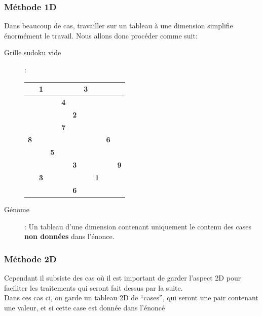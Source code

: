             \subsubsection{Méthode 1D}
                Dans beaucoup de cas, travailler sur un tableau à une dimension simplifie énormément le travail. Nous allons donc procéder comme suit:
                \begin{description}
                    \item[Grille sudoku vide]:\\
                        \begin{center}
                            \begin{tabular}{|c|c|c| |c|c|c| |c|c|c|}
                                \hline
                                &\textbf{1}&&&&\textbf{3}&&&\\
                                \hline
                                &&&\textbf{4}&&&&&\\
                                \hline
                                &&&&\textbf{2}&&&&\\
                                \hline
                                \hline
                                &&&\textbf{7}&&&&&\\
                                \hline
                                \textbf{8}&&&&&&&\textbf{6}&\\
                                \hline
                                &&\textbf{5}&&&&&&\\
                                \hline
                                \hline
                                &&&&\textbf{3}&&&&\textbf{9}\\
                                \hline
                                &\textbf{3}&&&&&\textbf{1}&&\\
                                \hline
                                &&&&\textbf{6}&&&&\\
                                \hline
                            \end{tabular}
                        \end{center}
                    \item[G\'enome]: Un tableau d'une dimension contenant uniquement le contenu des cases \textbf{non données} dans l'énonce.
                \end{description}
            \subsubsection{Méthode 2D}
                Cependant il subsiste des cas où il est important de garder l'aspect 2D pour faciliter les traitements qui seront fait dessus par la suite.\\
                Dans ces cas ci, on garde un tableau 2D de ``cases'', qui seront une pair contenant une valeur, et si cette case est donnée dans l'énoncé
